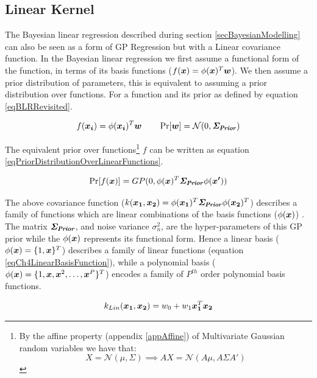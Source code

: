 \subsection{Linear Kernel} \label{subSecCh4LinearKernel}
The Bayesian linear regression described during section \ref{secBayesianModelling} can also be seen as a form of GP Regression but with a Linear covariance function. In the Bayesian linear regression we first assume a functional form of the function, in terms of its basis functions ($f(\boldsymbol{x}) = \phi(\boldsymbol{x})^{T}\boldsymbol{w}$). We then assume a prior distribution of parameters, this is equivalent to assuming a prior distribution over functions. For a function and its prior as defined by equation \ref{eqBLRRevisited}.

\begin{equation}\label{eqBLRRevisited}
    f(\boldsymbol{x_{i}}) = \phi(\boldsymbol{x_{i}})^{T}\boldsymbol{w}
\quad \quad \Pr[\boldsymbol{w}] = \mathcal{N}(0, \bm{\mathit{\Sigma_{Prior}}} ) 
\end{equation}

The equivalent prior over functions\footnote{By the affine property (appendix \ref{appAffine}) of Multivariate Gaussian random variables we have that: $$X = \mathcal{N}(\mu, \Sigma) \implies AX = \mathcal{N}(A\mu, A\Sigma A')$$} $f$ can be written as equation \ref{eqPriorDistributionOverLinearFunctions}.

\begin{equation}\label{eqPriorDistributionOverLinearFunctions}
    \Pr[f(\boldsymbol{x})] = GP(0, \phi(\boldsymbol{x})^{T} \bm{\mathit{\Sigma_{Prior}}} \phi(\boldsymbol{x'}))
\end{equation}

The above covariance function ($k(\boldsymbol{x_{1}}, \boldsymbol{x_{2}}) = \phi(\boldsymbol{x_1})^{T} \bm{\mathit{\Sigma_{Prior}}} \phi(\boldsymbol{x_2})^{T}$) describes a family of functions which are linear combinations of the basis functions ($\phi(\boldsymbol{x})$) \cite{bishop2006pattern}. The matrix $\bm{\mathit{\Sigma_{Prior}}}$, and noise variance $\sigma_{n}^2$, are the hyper-parameters of this GP prior while the $\phi(\boldsymbol{x})$ represents its functional form. Hence a linear basis ($\phi(\boldsymbol{x}) = \{1, \boldsymbol{x}\}^{T}$) describes a family of linear functions (equation \ref{eqCh4LinearBasisFunction}), while a polynomial basis ($\phi(\boldsymbol{x}) = \{1, \boldsymbol{x}, \boldsymbol{x}^2, \ldots, \boldsymbol{x}^P\}^{T}$) encodes a family of $P^{th}$ order polynomial basis functions.

\begin{equation}\label{eqCh4LinearBasisFunction}
k_{Lin}(\boldsymbol{x_{1}}, \boldsymbol{x_{2}}) = w_{0} + w_{1} \boldsymbol{x_{1}}^T \boldsymbol{x_{2}}
\end{equation}

